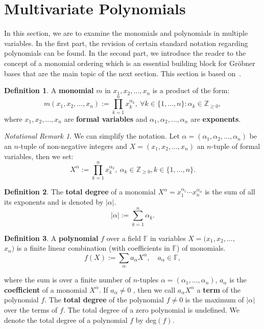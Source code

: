 \documentclass[thesis=M,english]{FITthesis}[2012/10/20]
\theoremstyle{remark}
\newtheorem*{NRM}{Notational Remark}
\theoremstyle{definition}
\newtheorem{DF}{Definition}[section]
\begin{document}
\section{Multivariate Polynomials}
In this section, we are to examine the monomials and polynomials in multiple variables. In the first part, the revision of certain standard notation regarding polynomials can be found. In the second part, we introduce the reader to the concept of a monomial ordering which is an essential building block for Gröbner bases that are the main topic of the next section. This section is based on~\cite{algGeom}.
\begin{DF}
A \textbf{monomial} $m$ in $x_1,x_2,\ldots,x_n$ is a product of the form:
$$
m(x_1,x_2,\ldots,x_n) :=  \prod_{k=1}^nx_k^{\alpha_k},\ \forall k \in \{1, \ldots, n\}: \alpha_k \in\mathbb{Z}_{\geq 0},
$$
where $x_1,x_2,\ldots,x_n$ are \textbf{formal variables} and $\alpha_1,\alpha_2,\ldots,\alpha_n$ are \textbf{exponents}. 
\end{DF}
\begin{NRM} We can simplify the notation. Let $\alpha = (\alpha_1,\alpha_2,\ldots,\alpha_n)$ be an $n$-tuple of non-negative integers and $X = (x_1,x_2,\ldots,x_n)$ an $n$-tuple of formal variables, then we set:
$$
X^\alpha := \prod_{k=1}^nx_k^{\alpha_k},\ \alpha_k \in\mathbb{Z}_{\geq 0}, k \in \{1, \ldots, n\}.
$$
\end{NRM}
\begin{DF}
The \textbf{total degree} of a monomial $X^\alpha=x_1^{\alpha_1}\cdots x_n^{\alpha_n}$ is the sum of all its exponents and is denoted by $|\alpha|$.
$$
|\alpha| := \sum_{k=1}^n \alpha_k.
$$
\end{DF}
\begin{DF}
A \textbf{polynomial}  $f$ over a field $\mathbb{F}$ in variables $X = (x_1,x_2,\ldots,$\\$x_n)$ is a finite linear combination (with coefficients in $\mathbb{F}$) of monomials.
$$
f(X) := \sum_{\alpha} a_{\alpha}X^\alpha, \quad a_{\alpha} \in \mathbb{F},
$$
\end{DF}
\noindent where the sum is over a finite number of $n$-tuples $\alpha = (\alpha_1, \ldots, \alpha_n)$, $a_\alpha$ is the \textbf{coefficient} of a monomial $X^\alpha$. If $a_\alpha \neq 0$ , then we call $a_{\alpha}X^\alpha$ a \textbf{term} of the  polynomial $f$. The \textbf{total degree} of the polynomial $f \neq 0$ is the maximum  of $|\alpha |$ over the terms of $f$. The total degree of a zero polynomial is undefined. We denote the total degree of a polynomial $f$ by deg$(f)$.
\end{document}
